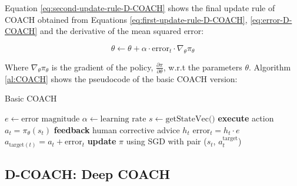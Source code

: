 Equation \eqref{eq:second-update-rule-D-COACH} shows the final update rule of COACH obtained from Equations \eqref{eq:first-update-rule-D-COACH}, \eqref{eq:error-D-COACH} and the derivative of the mean squared error:


\begin{equation}
\theta \leftarrow \theta + \alpha \cdot \text{error}_t \cdot \nabla_\theta \pi_\theta
\label{eq:second-update-rule-D-COACH}
\end{equation}



Where $\nabla_\theta \pi_\theta$ is the gradient of the policy, $\frac{\partial \pi}{\partial \theta}$, w.r.t the parameters $\theta$. Algorithm \ref{al:COACH} shows the pseudocode of the basic COACH version:


\begin{algorithm}[H]
\caption{Basic COACH}
\begin{algorithmic}[1]
\State $e \leftarrow \text{error magnitude}$ 
\State $\alpha \leftarrow \text{learning rate}$ 
 {}
\State $s \leftarrow \text{getStateVec()}$
\State \textbf{execute} action $a_{t}=\pi_{\theta}(s_{t})$
\State \textbf{feedback} human corrective advice $h_{t}$
\State $\text{error}_{t} = h_{t}\cdot e$
\State $a_{\text{target}(t)} = a_{t} + \text{error}_{t}$
\State \textbf{update} $\pi$ using SGD with pair ($s_{t}$, $a^{\text{target}}_{t}$)
\EndIf
\EndWhile
\end{algorithmic}
\label{al:COACH}
\end{algorithm}

\subsection{D-COACH: Deep COACH}
\label{subsection:D-COACH}



